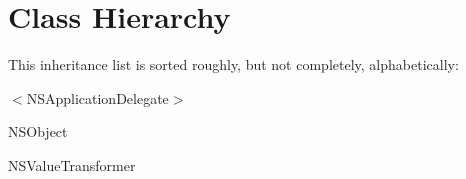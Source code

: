 \section{Class Hierarchy}
This inheritance list is sorted roughly, but not completely, alphabetically\-:\begin{DoxyCompactList}
\item $<$N\-S\-Application\-Delegate$>$\begin{DoxyCompactList}
\item {}
\end{DoxyCompactList}
\item N\-S\-Object\begin{DoxyCompactList}
\item {}
\end{DoxyCompactList}
\item N\-S\-Value\-Transformer\begin{DoxyCompactList}
\item {}
\item {}
\end{DoxyCompactList}
\end{DoxyCompactList}
